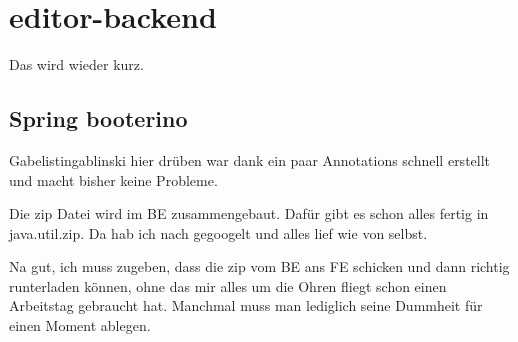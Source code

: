 \section{editor-backend}\label{sec:editor-backend}
Das wird wieder kurz.

\subsection{Spring booterino}\label{subsec:spring-booterino}
Gabelistingablinski hier drüben war dank ein paar Annotations schnell erstellt und macht bisher keine Probleme.

Die zip Datei wird im BE zusammengebaut.
Dafür gibt es schon alles fertig in java.util.zip.
Da hab ich nach gegoogelt und alles lief wie von selbst.

Na gut, ich muss zugeben, dass die zip vom BE ans FE schicken und dann richtig runterladen können,
ohne das mir alles um die Ohren fliegt schon einen Arbeitstag gebraucht hat.
Manchmal muss man lediglich seine Dummheit für einen Moment ablegen.
